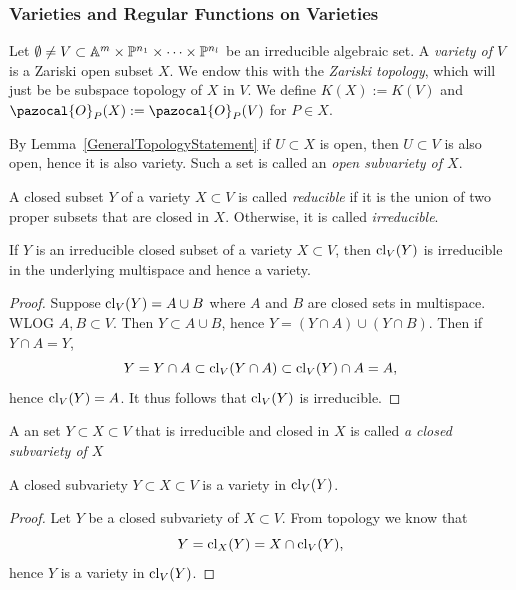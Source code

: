     \subsubsection{Varieties and Regular Functions on Varieties}
    \begin{definition}
        Let $\emptyset \neq V \subset \mathbb{A}^m\times \mathbb{P}^{n_1}\times \cdots \times \mathbb{P}^{n_l}$ be an irreducible algebraic set. A \textit{variety of $V$} is a Zariski open subset $X$. We endow this with the \textit{Zariski topology}, which will just be be subspace topology of $X$ in $V$. We define $K(X):= K(V)$ and $\pazocal{O}_P(X):=\pazocal{O}_P(V)$ for $P\in X$.
    \end{definition}
    \begin{remark}
        By Lemma~\ref{GeneralTopologyStatement} if $U\subset X$ is open, then $U\subset V$ is also open, hence it is also variety. Such a set is called an \textit{open subvariety of $X$}.
    \end{remark}
    \begin{definition}
        A closed subset $Y$ of a variety $X\subset V$ is called \emph{reducible} if it is the union of two proper subsets that are closed in $X$. Otherwise, it is called \emph{irreducible}. 
    \end{definition}
    \begin{lemma}
        If $Y$ is an irreducible closed subset of a variety $X\subset V$, then $\mathrm{cl}_V(Y)$ is irreducible in the underlying multispace and hence a variety. 
    \end{lemma}
    \begin{proof}
        Suppose $\mathrm{cl}_V(Y)= A\cup B$ where $A$ and $B$ are closed sets in multispace. WLOG $A,B\subset V$. Then $Y\subset A\cup B$, hence $Y=(Y\cap A) \cup (Y\cap B)$. Then if $Y\cap A = Y$, 
        $$Y=Y\cap A\subset \mathrm{cl}_V(Y\cap A)\subset \mathrm{cl}_V(Y)\cap A=A,$$ hence $\mathrm{cl}_V(Y)=A$. It thus follows that $\mathrm{cl}_V(Y)$ is irreducible.
    \end{proof}
    \begin{definition}
        A an set $Y\subset X\subset V$ that is irreducible and closed in $X$ is called \textit{a closed subvariety of $X$}
    \end{definition}
    \begin{lemma}\label{ClosedSubvarietyIsVarietyInClosure}
        A closed subvariety $Y\subset X\subset V$ is a variety in $\mathrm{cl}_V(Y)$.
    \end{lemma}
    \begin{proof}
       Let $Y$ be a closed subvariety of $X\subset V$. From topology we know that 
       $$Y=\mathrm{cl}_X(Y)=X\cap \mathrm{cl}_V(Y),$$ hence $Y$ is a variety in $\mathrm{cl}_V(Y)$. 
    \end{proof}
